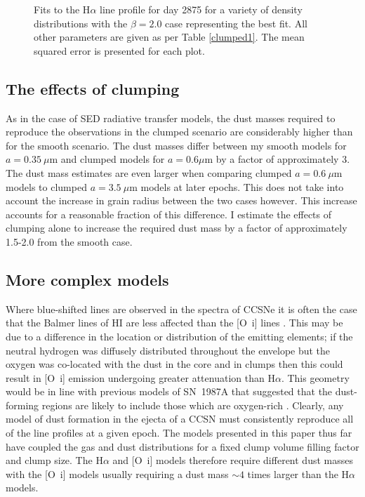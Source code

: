 \begin{figure}
\caption{Fits to the H$\alpha$ line profile for day 2875 for a variety of density distributions with the $\beta=2.0$ case representing the best fit.  All other parameters are given as per Table \ref{clumped1}. The mean squared error is presented for each plot.}
\label{fig:MSE4}
\end{figure}

\subsection{The effects of clumping}

As in the case of SED radiative transfer models, the dust masses required 
to reproduce the observations in the clumped scenario are considerably 
higher than for the smooth scenario.  The dust masses differ between my 
smooth models for $a=0.35~\mu$m and clumped models for $a=0.6\mu$m by a 
factor of approximately 3.  The dust mass estimates are even larger when
comparing clumped $a=0.6~\mu$m models to clumped $a=3.5~\mu$m models at 
later epochs. This does not take into account the increase in grain radius 
between the two cases however.  This increase accounts for a reasonable 
fraction of this difference. I estimate the effects of clumping alone to 
increase the required dust mass by a factor of approximately 1.5-2.0 from 
the smooth case.


\subsection{More complex models}
\label{complex}

Where blue-shifted lines are observed in the spectra of CCSNe it is often the case that the Balmer lines of HI are less affected than the [O~{\sc i}] lines \citep{Milisavljevic2012}.  This may be due to a difference in the location or distribution of the emitting elements; if the neutral hydrogen was diffusely distributed throughout the envelope but the oxygen was co-located with the dust in the core and in clumps then this could result in [O~{\sc i}] emission undergoing greater attenuation than H$\alpha$.  This geometry would be in line with previous models of SN~1987A that suggested that the dust-forming regions are likely to include those which are oxygen-rich \citep{Kozma1998a}.  Clearly, any model of dust formation in the ejecta of a CCSN must consistently reproduce all of the line profiles at a given epoch.  The models presented in this paper thus far have coupled the gas and dust distributions for a fixed clump volume filling factor and clump size.  The H$\alpha$ and [O~{\sc i}] models therefore require different dust masses with the [O~{\sc i}] models usually requiring a dust mass $\sim4$ times larger than the H$\alpha$ models. 

